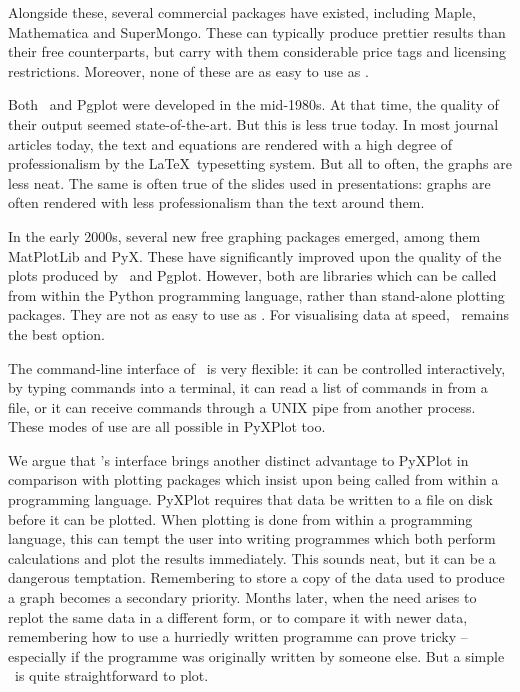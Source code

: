 Alongside these, several commercial packages have existed, including {\sc
Maple}, {\sc Mathematica} and {\sc
SuperMongo}.  These can typically produce prettier results
than their free counterparts, but carry with them considerable price tags and
licensing restrictions. Moreover, none of these are as easy to use as \gnuplot.

Both \gnuplot\ and Pgplot were developed in the mid-1980s. At that time, the
quality of their output seemed state-of-the-art. But this is less true today.
In most journal articles today, the text and equations are rendered with a high
degree of professionalism by the \LaTeX\ typesetting system. But all to often,
the graphs are less neat.  The same is often true of the slides used in
presentations: graphs are often rendered with less professionalism than the
text around them.

In the early 2000s, several new free graphing packages emerged, among them {\sc
MatPlotLib} and {\sc PyX}.  These have
significantly improved upon the quality of the plots produced by \gnuplot\ and
Pgplot. However, both are libraries which can be called from within the Python
programming language, rather than stand-alone plotting packages. They are not
as easy to use as \gnuplot.  For visualising data at speed, \gnuplot\ remains the
best option.

The command-line interface of \gnuplot\ is very flexible: it can be controlled
interactively, by typing commands into a terminal, it can read a list of
commands in from a file, or it can receive commands through a UNIX pipe from
another process. These modes of use are all possible in PyXPlot too.

We argue that \gnuplot's interface brings another distinct advantage to PyXPlot
in comparison with plotting packages which insist upon being called from within
a programming language. PyXPlot requires that data be written to a file on disk
before it can be plotted. When plotting is done from within a programming
language, this can tempt the user into writing programmes which both perform
calculations and plot the results immediately.  This sounds neat, but it can be
a dangerous temptation. Remembering to store a copy of the data used to produce
a graph becomes a secondary priority.  Months later, when the need arises to
replot the same data in a different form, or to compare it with newer data,
remembering how to use a hurriedly written programme can prove tricky --
especially if the programme was originally written by someone else. But a simple
\datafile\ is quite straightforward to plot.

